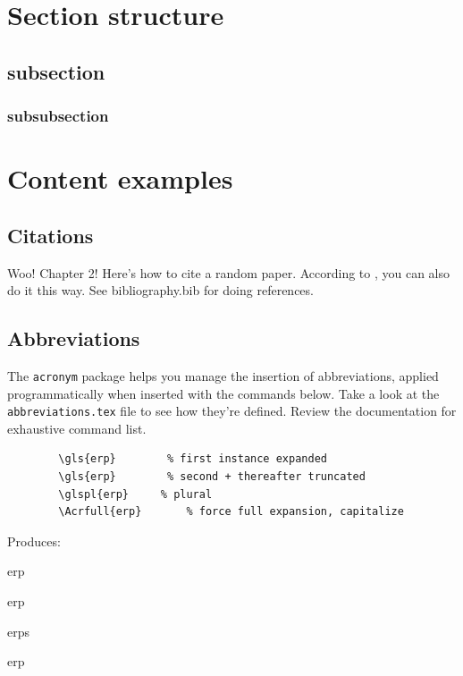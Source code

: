 \documentclass[../../main.tex]{subfiles}  %
\begin{document}
\section{Section structure}

	\subsection{subsection}

	\subsubsection{subsubsection}

\section{Content examples}

	\subsection{Citations}

	Woo! 
	Chapter 2!
	Here's how to cite a random paper\supercite{aartsSolutionDependencyUsing2014}. 
	According to \citeauthor{aartsSolutionDependencyUsing2014} \citeyear{aartsSolutionDependencyUsing2014}, you can also do it this way.
	See bibliography.bib for doing references.

	\subsection{Abbreviations}

	The \verb|acronym| package helps you manage the insertion of abbreviations, applied programmatically when inserted with the commands below. 
	Take a look at the \verb|abbreviations.tex| file to see how they're defined.
	Review the documentation for exhaustive command list.

	\begin{verbatim}
		\gls{erp}		 % first instance expanded
		\gls{erp}		 % second + thereafter truncated
		\glspl{erp}		% plural
		\Acrfull{erp}		% force full expansion, capitalize
	  \end{verbatim}

	Produces: 
	\begin{enumerate*}[label=(\roman*), itemjoin={{, }}, itemjoin={{, }}, itemjoin*={{, and }}]
	\item \gls{erp}
	\item \gls{erp}
	\item \glspl{erp}
	\item \Acrfull{erp}
	\end{enumerate*}
\end{document}
